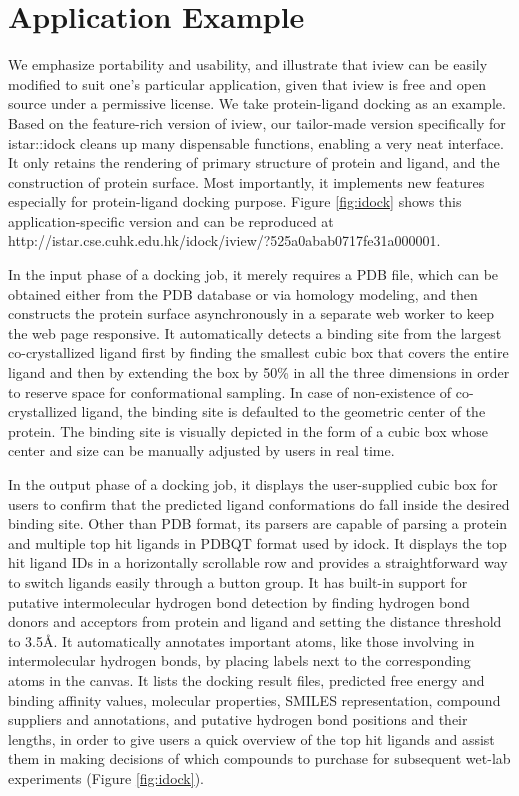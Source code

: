 \section{Application Example}

We emphasize portability and usability, and illustrate that iview can be easily modified to suit one's particular application, given that iview is free and open source under a permissive license. We take protein-ligand docking as an example. Based on the feature-rich version of iview, our tailor-made version specifically for istar::idock cleans up many dispensable functions, enabling a very neat interface. It only retains the rendering of primary structure of protein and ligand, and the construction of protein surface. Most importantly, it implements new features especially for protein-ligand docking purpose. Figure \ref{fig:idock} shows this application-specific version and can be reproduced at http://istar.cse.cuhk.edu.hk/idock/iview/?525a0abab0717fe31a000001.

In the input phase of a docking job, it merely requires a PDB file, which can be obtained either from the PDB database \citep{1357} or via homology modeling, and then constructs the protein surface asynchronously in a separate web worker to keep the web page responsive. It automatically detects a binding site from the largest co-crystallized ligand first by finding the smallest cubic box that covers the entire ligand and then by extending the box by 50\% in all the three dimensions in order to reserve space for conformational sampling. In case of non-existence of co-crystallized ligand, the binding site is defaulted to the geometric center of the protein. The binding site is visually depicted in the form of a cubic box whose center and size can be manually adjusted by users in real time.

In the output phase of a docking job, it displays the user-supplied cubic box for users to confirm that the predicted ligand conformations do fall inside the desired binding site. Other than PDB format, its parsers are capable of parsing a protein and multiple top hit ligands in PDBQT format used by idock. It displays the top hit ligand IDs in a horizontally scrollable row and provides a straightforward way to switch ligands easily through a button group. It has built-in support for putative intermolecular hydrogen bond detection by finding hydrogen bond donors and acceptors from protein and ligand and setting the distance threshold to 3.5\AA. It automatically annotates important atoms, like those involving in intermolecular hydrogen bonds, by placing labels next to the corresponding atoms in the canvas. It lists the docking result files, predicted free energy and binding affinity values, molecular properties, SMILES representation, compound suppliers and annotations, and putative hydrogen bond positions and their lengths, in order to give users a quick overview of the top hit ligands and assist them in making decisions of which compounds to purchase for subsequent wet-lab experiments (Figure \ref{fig:idock}).

